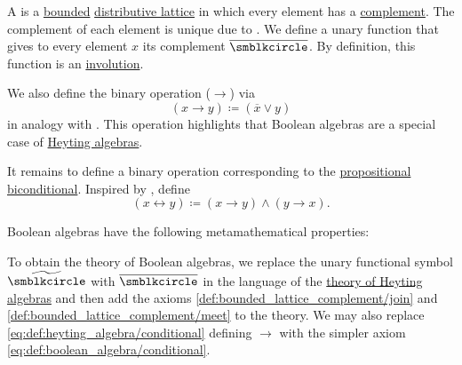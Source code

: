 \begin{definition}\label{def:boolean_algebra}
  A  is a \hyperref[def:semilattice/bounded]{bounded} \hyperref[def:semilattice/distributive_lattice]{distributive lattice} in which every element has a \hyperref[def:bounded_lattice_complement]{complement}. The complement of each element is unique due to . We define a unary function that gives to every element \( x \) its complement \( \overline \anon \). By definition, this function is an \hyperref[def:involution]{involution}.

  \begin{thmenum}[series=def:boolean_algebra]
     We also define the binary operation  (\( \rightarrow \)) via
    \begin{equation}\label{eq:def:boolean_algebra/conditional}
      (x \rightarrow y) \coloneqq (\overline x \vee y)
    \end{equation}
    in analogy with . This operation highlights that Boolean algebras are a special case of \hyperref[thm:boolean_algebras_are_heyting_algebras]{Heyting algebras}.

     It remains to define a binary operation corresponding to the \hyperref[def:propositional_language/connectives/biconditional]{propositional biconditional}. Inspired by , define
    \begin{equation}\label{eq:def:boolean_algebra/biconditional}
      (x \leftrightarrow y) \coloneqq (x \rightarrow y) \wedge (y \rightarrow x).
    \end{equation}
  \end{thmenum}

  Boolean algebras have the following metamathematical properties:
  \begin{thmenum}[resume=def:boolean_algebra]
     To obtain the theory of Boolean algebras, we replace the unary functional symbol \( \widetilde{\anon} \) with \( \overline \anon \) in the language of the \hyperref[def:heyting_algebra/theory]{theory of Heyting algebras} and then add the axioms \eqref{def:bounded_lattice_complement/join} and \eqref{def:bounded_lattice_complement/meet} to the theory. We may also replace \eqref{eq:def:heyting_algebra/conditional} defining \( \rightarrow \) with the simpler axiom \eqref{eq:def:boolean_algebra/conditional}.


\end{thmenum}
\end{definition}
